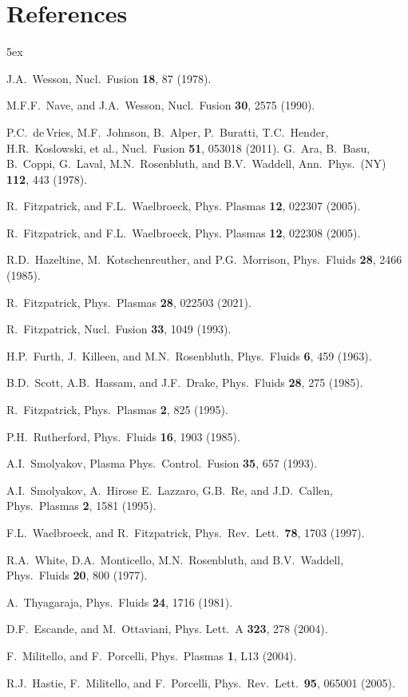 \documentclass[12pt,prb,aps]{revtex4-1}
\begin{document}
\section*{References}
\begin{thebibliography}{99}\baselineskip 5ex

 J.A.~Wesson, Nucl.\ Fusion {\bf 18}, 87 (1978).

 M.F.F.~Nave, and J.A.~Wesson, Nucl.\ Fusion {\bf 30}, 2575 (1990).

 P.C.~de\,Vries, M.F.~Johnson, B.~Alper, P.~Buratti, T.C.~Hender, H.R.~Koslowski, et al., Nucl.\ Fusion {\bf 51}, 053018 (2011).
 G.~Ara, B.~Basu, B.~Coppi, G.~Laval, M.N.~Rosenbluth, and B.V.~Waddell, Ann.\ Phys.\ (NY) {\bf 112}, 443 (1978).

 R.~Fitzpatrick, and F.L.~Waelbroeck, Phys. Plasmas {\bf 12}, 022307 (2005).

 R.~Fitzpatrick, and F.L.~Waelbroeck, Phys. Plasmas {\bf 12}, 022308 (2005).

 R.D.~Hazeltine, M.~Kotschenreuther, and P.G.~Morrison, Phys.\ Fluids {\bf 28}, 2466 (1985).

 R.~Fitzpatrick, Phys.\ Plasmas {\bf 28}, 022503 (2021). 

 R.~Fitzpatrick, Nucl.\ Fusion {\bf 33}, 1049 (1993).

 H.P.~Furth, J.~Killeen, and M.N.~Rosenbluth, Phys.\ Fluids {\bf 6}, 459 (1963).

 B.D.~Scott,  A.B.~Hassam, and J.F.~Drake, Phys.\ Fluids {\bf 28}, 275 (1985). 

 R.~Fitzpatrick, Phys.\ Plasmas {\bf 2}, 825 (1995). 

 P.H.~Rutherford, Phys.\ Fluids {\bf 16}, 1903 (1985). 

 A.I.~Smolyakov, Plasma Phys.\ Control.\ Fusion {\bf 35}, 657 (1993).

 A.I.~Smolyakov, A.~Hirose E.~Lazzaro, G.B.~Re, and  J.D.~Callen, Phys.\ Plasmas {\bf 2}, 1581 (1995). 

 F.L.~Waelbroeck, and R.~Fitzpatrick, Phys.\ Rev.\ Lett.\ {\bf 78}, 1703 (1997). 

 R.A.~White, D.A.~Monticello, M.N.~Rosenbluth, and B.V.~Waddell, Phys.\ Fluids {\bf 20}, 800 (1977). 

 A.~Thyagaraja, Phys.\ Fluids {\bf 24}, 1716 (1981). 

 D.F.~Escande, and M.~Ottaviani, Phys. Lett.\ A {\bf 323}, 278 (2004).

 F.~Militello, and F.~Porcelli, Phys.\ Plasmas {\bf 1}, L13 (2004).

 R.J.~Hastie, F.~Militello, and F.~Porcelli, Phys.\ Rev.\ Lett.\ {\bf 95}, 065001 (2005).

\end{thebibliography}
\end{document}

